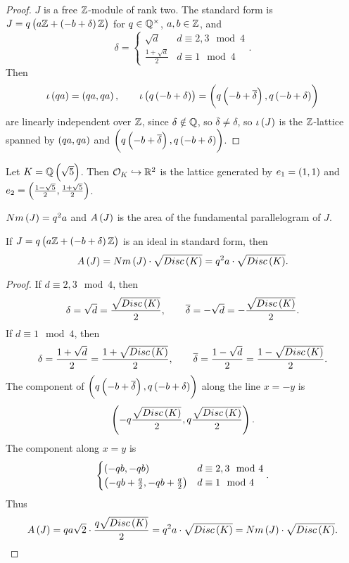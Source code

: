 \begin{proof}
$ J $ is a free $ \mathbb{Z} $-module of rank two. The standard form is $ J = q\br{a\Z + \br{-b + \delta}\Z} $ for $ q \in \mathbb{Q}^\times $, $ a, b \in \mathbb{Z} $, and
$$ \delta =
\begin{cases}
\sqrt{d} & d \equiv 2, 3 \mod 4 \\
\tfrac{1 + \sqrt{d}}{2} & d \equiv 1 \mod 4
\end{cases}.
$$
Then
$$ \iota\br{qa} = \br{qa, qa}, \qquad \iota\br{q\br{-b + \delta}} = \br{q\br{-b + \overline{\delta}}, q\br{-b + \delta}} $$
are linearly independent over $ \mathbb{Z} $, since $ \delta \notin \mathbb{Q} $, so $ \overline{\delta} \ne \delta $, so $ \iota\br{J} $ is the $ \mathbb{Z} $-lattice spanned by $ \br{qa, qa} $ and $ \br{q\br{-b + \overline{\delta}}, q\br{-b + \delta}} $.
\end{proof}

\begin{example*}
Let $ K = \Q\br{\sqrt{5}} $. Then $ \mathcal{O}_K \hookrightarrow \mathbb{R}^2 $ is the lattice generated by $ e_1 = \br{1, 1} $ and $ e_2 = \br{\tfrac{1 - \sqrt{5}}{2}, \tfrac{1 + \sqrt{5}}{2}} $.
\end{example*}

\pagebreak

$ Nm\br{J} = q^2a $ and $ A\br{J} $ is the area of the fundamental parallelogram of $ J $.

\begin{proposition}
If $ J = q\br{a\Z + \br{-b + \delta}\Z} $ is an ideal in standard form, then
$$ A\br{J} = Nm\br{J} \cdot \sqrt{Disc\br{K}} = q^2a \cdot \sqrt{Disc\br{K}}. $$
\end{proposition}

\begin{proof}
If $ d \equiv 2, 3 \mod 4 $, then
$$ \delta = \sqrt{d} = \dfrac{\sqrt{Disc\br{K}}}{2}, \qquad \overline{\delta} = -\sqrt{d} = -\dfrac{\sqrt{Disc\br{K}}}{2}. $$
If $ d \equiv 1 \mod 4 $, then
$$ \delta = \dfrac{1 + \sqrt{d}}{2} = \dfrac{1 + \sqrt{Disc\br{K}}}{2}, \qquad \overline{\delta} = \dfrac{1 - \sqrt{d}}{2} = \dfrac{1 - \sqrt{Disc\br{K}}}{2}. $$
The component of $ \br{q\br{-b + \overline{\delta}}, q\br{-b + \delta}} $ along the line $ x = -y $ is
$$ \br{-q\dfrac{\sqrt{Disc\br{K}}}{2}, q\dfrac{\sqrt{Disc\br{K}}}{2}}. $$
The component along $ x = y $ is
$$
\begin{cases}
\br{-qb, -qb} & d \equiv 2, 3 \mod 4 \\
\br{-qb + \tfrac{q}{2}, -qb + \tfrac{q}{2}} & d \equiv 1 \mod 4
\end{cases}.
$$
Thus
$$ A\br{J} = qa\sqrt{2} \cdot \dfrac{q\sqrt{Disc\br{K}}}{2} = q^2a \cdot \sqrt{Disc\br{K}} = Nm\br{J} \cdot \sqrt{Disc\br{K}}. $$
\end{proof}

